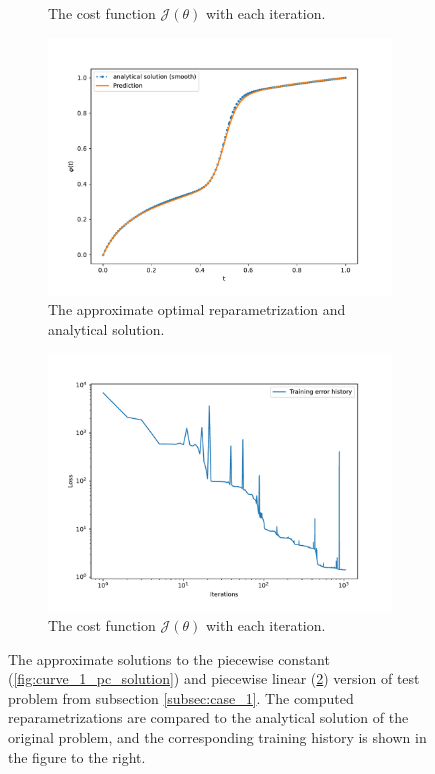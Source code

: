 \begin{figure}[t]
\begin{subfigure}[t]{0.5\textwidth}
        \caption{The cost function \(\mathcal{J}(\theta)\) with each iteration.}\label{fig:curve_1_pc_history}
    \end{subfigure}
    \begin{subfigure}[t]{0.5\textwidth}
        \centering
        \includegraphics[width=\linewidth]{figures/curve_1_pl/exp_2/plot_0_0.pdf}
        \caption{The approximate optimal reparametrization and analytical solution.}\label{fig:curve_1_pl_solution}\end{subfigure}
    \begin{subfigure}[t]{0.5\textwidth}
        \centering
        \includegraphics[width=\linewidth]{figures/curve_1_pl/exp_2/history_plot_0.pdf}
        \caption{The cost function \(\mathcal{J}(\theta)\) with each iteration.}\label{fig:curve_1_pl_history}
    \end{subfigure}
    \caption{The approximate solutions to the piecewise constant (\ref{fig:curve_1_pc_solution}) and piecewise linear (\ref{fig:curve_1_pl_solution}) version of test problem from subsection \ref*{subsec:case_1}. The computed reparametrizations are compared to the analytical solution of the original problem, and the corresponding training history is shown in the figure to the right.}\label{fig:curve_1_pc_pl_example}
\end{figure}

